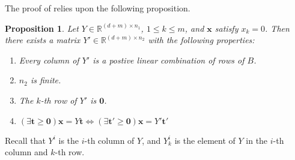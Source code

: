 \documentclass[fleqn]{article}
\renewcommand{\vec}[1]{\mathbf{#1}}
\newcommand{\R}{\mathbb{R}}
\newcommand{\0}{\vec{0}}
\newcommand{\x}{\vec{x}}
\renewcommand{\t}{\vec{t}}
\newcommand{\Yi}{Y^i_{k}}
\newtheorem{Prop}{Proposition}
\begin{document}
The proof of {\Hint} relies upon the following proposition.
\begin{Prop}{\label{prop:Hintset}
Let $Y \in \R^{(d+m)\times n_1}$, $1 \leq k \leq m$, and $\x$ satisfy $x_k = 0$.  Then there exists a matrix $Y' \in \R^{(d+m)\times n_2}$ with the following properties:
  \begin{enumerate}
    \item Every column of $Y'$ is a postive linear combination of rows of $B$.
    \item $n_2$ is finite.
    \item The $k$-th row of $Y'$ is $\0$.
    \item \((\exists \t\geq\0)\x = Y\t \Leftrightarrow (\exists \t' \geq \0)\x = Y'\t'\)
  \end{enumerate}
}\end{Prop}
Recall that $ Y^i$ is the $i$-th column of $ Y$, and $\Yi$ is the element of $ Y$ in the $i$-th column and $k$-th row.  
\end{document}
